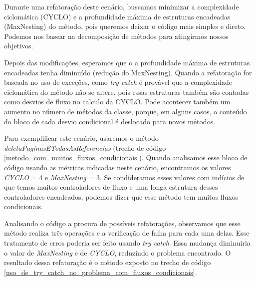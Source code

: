 Durante uma refatoração deste cenário, buscamos minimizar a complexidade ciclomática (CYCLO) e a profundidade máxima de estruturas encadeadas (MaxNesting) do método, pois queremos deixar o código mais simples e direto. Podemos nos basear na decomposição de métodos para atingirmos nossos objetivos.
	
Depois das modificações, esperamos que o a profundidade máxima de estruturas encadeadas tenha diminuído (redução do MaxNesting). Quando a refatoração for baseada no uso de exceções, como \textit{try catch} é provável que a complexidade ciclomática do método não se altere, pois essas estruturas também são contadas como desvios de fluxo no calculo da CYCLO. Pode acontecer também um aumento no número de métodos da classe, porque, em alguns casos, o conteúdo do bloco de cada desvio condicional é deslocado para novos métodos. 
           
Para exemplificar este cenário, usaremos o método \textit{deletaPaginasETodasAsReferencias} (trecho de código \ref{metodo_com_muitos_fluxos_condicionais}). Quando analisamos esse bloco de código usando as métricas indicadas neste cenário, encontramos os valores \textit{CYCLO} = 4 e \textit{MaxNesting} = 3. Se condideramos esses valores com indícios de que temos muitos controladores de fluxo e uma longa estrutura desses controladores encadeados, podemos dizer que esse método tem muitos fluxos condicionais. 
                                                                                          
               
                                                                                          
Analisando o código a procura de possíveis refatorações, observamos que esse método realiza três operações e a verificação de falha para cada uma delas. Esse tratamento de erros poderia ser feito usando \textit{try catch}. Essa mudança diminuiria o valor de \textit{MaxNesting} e de \textit{CYCLO}, reduzindo o problema encontrado. O resultado dessa refatoração é o método exposto no trecho de código \ref{uso_de_try_catch_no_problema_com_fluxos_condicionais}.
                                                         

              
